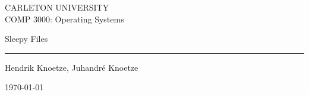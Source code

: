 \documentclass[12pt,letterpaper]{article}
\begin{document}
\renewcommand\headrule{}

\pagestyle{fancy}
\fancyhf{}
\rfoot{\thepage/\pageref{LastPage}}

\thispagestyle{empty}


\begin{center}
    CARLETON UNIVERSITY\\
	\vspace{0.5em}
	COMP 3000: Operating Systems
\end{center}

\vfill

\begin{center}
	{\Huge Sleepy Files}
	\vspace{0.5em}\rule{\textwidth}{0.5pt}
	Hendrik Knoetze, Juhandr\'e Knoetze	
\end{center}

\vfill

\begin{center}
	\today
\end{center}

\newpage{}

\tableofcontents{}



\newpage{}







\end{document}

